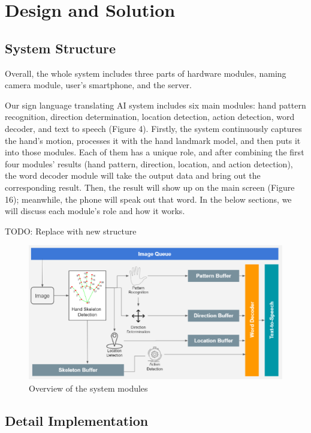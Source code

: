 \chapter{Design and Solution}

\section{System Structure}

Overall, the whole system includes three parts of hardware modules, naming camera module, user's smartphone, and the server.

Our sign language translating AI system includes six main modules: hand pattern recognition, direction determination, location detection, action detection, word decoder, and text to speech (Figure 4). Firstly, the system continuously captures the hand’s motion, processes it with the hand landmark model, and then puts it into those modules. Each of them has a unique role, and after combining the first four modules’ results (hand pattern, direction, location, and action detection), the word decoder module will take the output data and bring out the corresponding result. Then, the result will show up on the main screen (Figure 16); meanwhile, the phone will speak out that word. In the below sections, we will discuss each module’s role and how it works.

TODO: Replace with new structure

\begin{figure}[H]
  \centering
  \includegraphics[width=\textwidth]{img/Chap4/OverviewOfTheSystemModules.png}
  \caption{Overview of the system modules}
  \label{fig:Chap4-OverviewOfTheSystemModules}
\end{figure}

\section{Detail Implementation}

